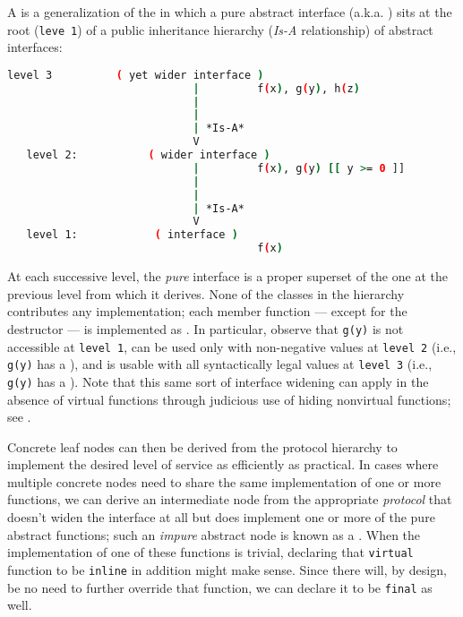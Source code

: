 {{A  is a generalization of the  in which a pure abstract interface (a.k.a.
) sits at the root (\lstinline!leve!}~\lstinline!1!) of a
public inheritance hierarchy (\emph{Is-A} relationship) of abstract
interfaces:

\begin{lstlisting}[language=bash,style=plain]
   level 3          ( yet wider interface )
                             |         f(x), g(y), h(z)
                             |
                             |
                             | *Is-A*
                             V
   level 2:           ( wider interface )
                             |         f(x), g(y) [[ y >= 0 ]]
                             |
                             |
                             | *Is-A*
                             V
   level 1:            ( interface )
                                       f(x)
\end{lstlisting}
    

\noindent At each successive level, the \emph{pure} interface is a proper superset
of the one at the previous level from which it derives. None of the
classes in the hierarchy contributes any implementation; each member
function --- except for the destructor --- is implemented as
. In particular, observe that \lstinline!g(y)! is not
accessible at \lstinline!level!~\lstinline!1!, can be used only with
non-negative values at \lstinline!level!~\lstinline!2! (i.e., \lstinline!g(y)!
has a ), and is usable with all syntactically
legal values at \lstinline!level!~\lstinline!3! (i.e., \lstinline!g(y)! has a
). Note that this same sort of interface widening
can apply in the absence of virtual functions through judicious use of
hiding nonvirtual functions; see .

Concrete leaf nodes can then be derived from the protocol hierarchy to
implement the desired level of service as efficiently as practical. In
cases where multiple concrete nodes need to share the same
implementation of one or more functions, we can derive an intermediate
node from the appropriate \emph{protocol} that doesn't widen the
interface at all but does implement one or more of the pure abstract
functions; such an \emph{impure} abstract node is known as a
. When the implementation of one of these
functions is trivial, declaring that \lstinline!virtual! function to be
\lstinline!inline! in addition might make sense. Since there will, by
design, be no need to further override that function, we can declare it
to be \lstinline!final! as well.

}
